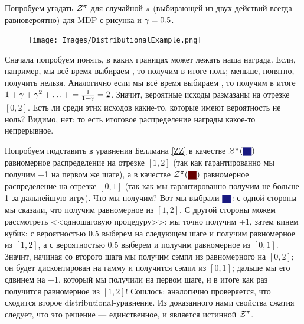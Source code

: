 \begin{example}
Попробуем угадать $\mathcal{Z}^{\pi}$ для случайной $\pi$ (выбирающей из двух действий всегда равновероятно) для MDP с рисунка и $\gamma \HM = 0.5$.

\begin{figure}
\vspace{-0.5cm}
\centering
\texttt{[image: Images/DistributionalExample.png]}
\vspace{-0.3cm}
\end{figure}

Сначала попробуем понять, в каких границах может лежать наша награда. Если, например, мы всё время выбираем , то получим в итоге ноль; меньше, понятно, получить нельзя. Аналогично если мы всё время выбираем , то получим в итоге $1 \HM+ \gamma \HM+ \gamma^2 \HM+ \dots \HM+ \HM= \frac{1}{1 - \gamma} \HM= 2$. Значит, вероятные исходы размазаны на отрезке $[0, 2]$. Есть ли среди этих исходов какие-то, которые имеют вероятность не ноль? Видимо, нет: то есть итоговое распределение награды какое-то непрерывное.

Попробуем подставить в уравнения Беллмана \eqref{ZZ} в качестве $\Z^{\pi}(\text{\colorsquare{ChadBlue}})$ равномерное распределение на отрезке $[1, 2]$ (так как гарантированно мы получим +1 на первом же шаге), а в качестве $\Z^{\pi}(\text{\colorsquare{ChadRed}})$ равномерное распределение на отрезке $[0, 1]$ (так как мы гарантированно получим не больше 1 за дальнейшую игру). Что мы получим? Вот мы выбрали $\colorsquare{ChadBlue}$: с одной стороны мы сказали, что получим равномерное из $[1, 2]$. С другой стороны можем рассмотреть <<одношаговую процедуру>>: мы точно получим +1, затем кинем кубик: с вероятностью 0.5 выберем на следующем шаге  и получим равномерное из $[1, 2]$, а с вероятностью 0.5 выберем  и получим равномерное из $[0, 1]$. Значит, начиная со второго шага мы получим сэмпл из равномерного на $[0, 2]$; он будет дисконтирован на гамму и получится сэмпл из $[0, 1]$; дальше мы его сдвинем на +1, который мы получили на первом шаге, и в итоге как раз получится равномерное из $[1, 2]$! Сошлось; аналогично проверяется, что сходится второе distributional-уравнение. Из доказанного нами свойства сжатия следует, что это решение --- единственное, и является истинной $\mathcal{Z}^{\pi}$. 
\end{example}

